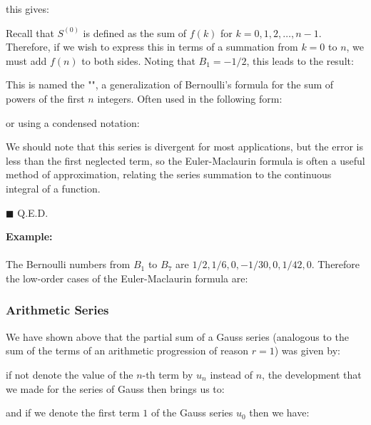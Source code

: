\begin{dem}
	this gives:
	
	Recall that $S^{(0)}$ is defined as the sum of $f(k)$ for $k=0,1,2, \ldots, n-1$. Therefore, if we wish to express this in terms of a summation from $k=0$ to $n$, we must add $f(n)$ to both sides. Noting that $B_{1}=-1 / 2$, this leads to the result:
	
	This is named the "", a generalization of Bernoulli's formula for the sum of powers of the first $n$ integers. Often used in the following form:
	
	or using a condensed notation:
	
	We should note that this series is divergent for most applications, but the error is less than the first neglected term, so the Euler-Maclaurin formula is often a useful method of approximation, relating the series summation to the continuous integral of a function.
	\begin{flushright}
		$\blacksquare$ Q.E.D.
	\end{flushright}
	\end{dem}
	
	\begin{tcolorbox}[colframe=black,colback=white,sharp corners]
	\textbf{{\Large {}}Example:}\\\\
	The Bernoulli numbers from $B_{1}$ to $B_{7}$ are $1/2, 1/6, 0,-1/30, 0, 1/42, 0$. Therefore the low-order cases of the Euler-Maclaurin formula are:
	
	\end{tcolorbox}
	
	\subsubsection{Arithmetic Series}
	We have shown above that the partial sum of a Gauss series (analogous to the sum of the terms of an arithmetic progression of reason $r = 1$) was given by:
	
	if not denote the value of the $n$-th term by $u_n$ instead of $n$, the development that we made for the series of Gauss then brings us to:
	
	and if we denote the first term $1$ of the Gauss series $u_0$ then we have:
	
